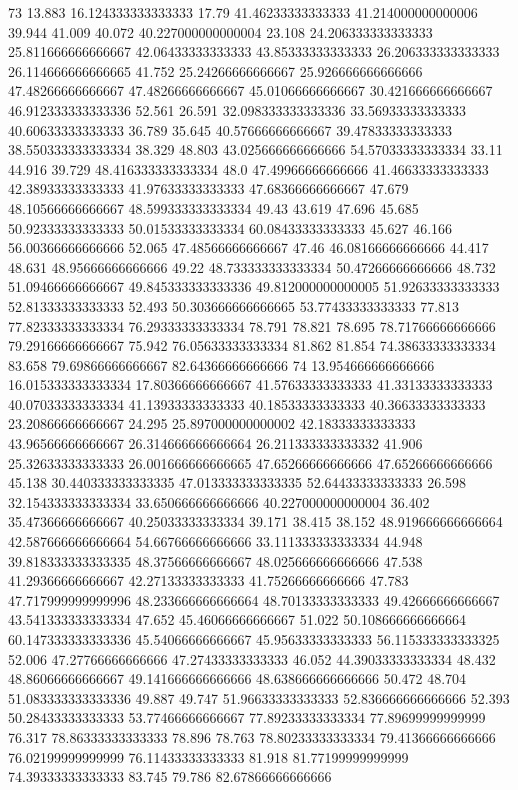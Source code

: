 73 13.883 16.124333333333333 17.79 41.46233333333333 41.214000000000006 39.944 41.009 40.072 40.227000000000004 23.108 24.206333333333333 25.811666666666667 42.06433333333333 43.85333333333333 26.206333333333333 26.114666666666665 41.752 25.24266666666667 25.926666666666666 47.48266666666667 47.48266666666667 45.01066666666667 30.421666666666667 46.912333333333336 52.561 26.591 32.098333333333336 33.56933333333333 40.60633333333333 36.789 35.645 40.57666666666667 39.47833333333333 38.550333333333334 38.329 48.803 43.025666666666666 54.57033333333334 33.11 44.916 39.729 48.416333333333334 48.0 47.49966666666666 41.46633333333333 42.38933333333333 41.97633333333333 47.68366666666667 47.679 48.10566666666667 48.599333333333334 49.43 43.619 47.696 45.685 50.92333333333333 50.01533333333334 60.08433333333333 45.627 46.166 56.00366666666666 52.065 47.48566666666667 47.46 46.08166666666666 44.417 48.631 48.95666666666666 49.22 48.733333333333334 50.47266666666666 48.732 51.09466666666667 49.845333333333336 49.812000000000005 51.92633333333333 52.81333333333333 52.493 50.303666666666665 53.77433333333333 77.813 77.82333333333334 76.29333333333334 78.791 78.821 78.695 78.71766666666666 79.29166666666667 75.942 76.05633333333334 81.862 81.854 74.38633333333334 83.658 79.69866666666667 82.64366666666666
74 13.954666666666666 16.015333333333334 17.80366666666667 41.57633333333333 41.33133333333333 40.07033333333334 41.13933333333333 40.18533333333333 40.36633333333333 23.20866666666667 24.295 25.897000000000002 42.18333333333333 43.96566666666667 26.314666666666664 26.211333333333332 41.906 25.32633333333333 26.001666666666665 47.65266666666666 47.65266666666666 45.138 30.440333333333335 47.013333333333335 52.64433333333333 26.598 32.154333333333334 33.650666666666666 40.227000000000004 36.402 35.47366666666667 40.25033333333334 39.171 38.415 38.152 48.919666666666664 42.587666666666664 54.66766666666666 33.111333333333334 44.948 39.818333333333335 48.37566666666667 48.025666666666666 47.538 41.29366666666667 42.27133333333333 41.75266666666666 47.783 47.717999999999996 48.233666666666664 48.70133333333333 49.42666666666667 43.541333333333334 47.652 45.46066666666667 51.022 50.108666666666664 60.147333333333336 45.54066666666667 45.95633333333333 56.115333333333325 52.006 47.27766666666666 47.27433333333333 46.052 44.39033333333334 48.432 48.86066666666667 49.141666666666666 48.638666666666666 50.472 48.704 51.083333333333336 49.887 49.747 51.96633333333333 52.836666666666666 52.393 50.28433333333333 53.77466666666667 77.89233333333334 77.89699999999999 76.317 78.86333333333333 78.896 78.763 78.80233333333334 79.41366666666666 76.02199999999999 76.11433333333333 81.918 81.77199999999999 74.39333333333333 83.745 79.786 82.67866666666666
